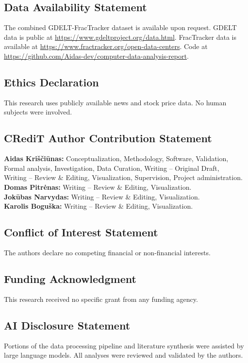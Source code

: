 \documentclass[5p,12pt]{elsarticle}
\begin{document}
\subsection*{Data Availability Statement}
{\sloppy The combined GDELT-FracTracker dataset is available upon request. GDELT data is public at \url{https://www.gdeltproject.org/data.html}. FracTracker data is available at \url{https://www.fractracker.org/open-data-centers}. Code at \url{https://github.com/Aidas-dev/computer-data-analysis-report}.\par}

\subsection*{Ethics Declaration}
This research uses publicly available news and stock price data. No human subjects were involved.

\subsection*{CRediT Author Contribution Statement}
\textbf{Aidas Kriščiūnas:} Conceptualization, Methodology, Software, Validation,\\Formal analysis, Investigation, Data Curation, Writing -- Original Draft,\\Writing -- Review \& Editing, Visualization, Supervision, Project administration.\\
\textbf{Domas Pitrėnas:} Writing -- Review \& Editing, Visualization.\\
\textbf{Jokūbas Narvydas:} Writing -- Review \& Editing, Visualization.\\
\textbf{Karolis Boguška:} Writing -- Review \& Editing, Visualization.

\subsection*{Conflict of Interest Statement}
The authors declare no competing financial or non-financial interests.

\subsection*{Funding Acknowledgment}
This research received no specific grant from any funding agency.

\subsection*{AI Disclosure Statement}
Portions of the data processing pipeline and literature synthesis were assisted by large language models. All analyses were reviewed and validated by the authors.
\end{document}
